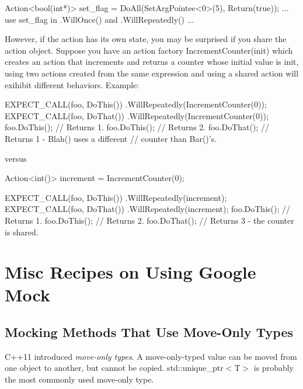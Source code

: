 \begin{DoxyCode}
Action<bool(int*)> set\_flag = DoAll(SetArgPointee<0>(5),
                                    Return(\textcolor{keyword}{true}));
... use set\_flag in .WillOnce() and .WillRepeatedly() ...
\end{DoxyCode}


However, if the action has its own state, you may be surprised if you share the action object. Suppose you have an action factory {\ttfamily Increment\+Counter(init)} which creates an action that increments and returns a counter whose initial value is {\ttfamily init}, using two actions created from the same expression and using a shared action will exihibit different behaviors. Example\+:


\begin{DoxyCode}
EXPECT\_CALL(foo, DoThis())
    .WillRepeatedly(IncrementCounter(0));
EXPECT\_CALL(foo, DoThat())
    .WillRepeatedly(IncrementCounter(0));
foo.DoThis();  \textcolor{comment}{// Returns 1.}
foo.DoThis();  \textcolor{comment}{// Returns 2.}
foo.DoThat();  \textcolor{comment}{// Returns 1 - Blah() uses a different}
               \textcolor{comment}{// counter than Bar()'s.}
\end{DoxyCode}


versus


\begin{DoxyCode}
Action<int()> increment = IncrementCounter(0);

EXPECT\_CALL(foo, DoThis())
    .WillRepeatedly(increment);
EXPECT\_CALL(foo, DoThat())
    .WillRepeatedly(increment);
foo.DoThis();  \textcolor{comment}{// Returns 1.}
foo.DoThis();  \textcolor{comment}{// Returns 2.}
foo.DoThat();  \textcolor{comment}{// Returns 3 - the counter is shared.}
\end{DoxyCode}


\section*{Misc Recipes on Using Google Mock}

\subsection*{Mocking Methods That Use Move-\/\+Only Types}

C++11 introduced {\itshape move-\/only types}. A move-\/only-\/typed value can be moved from one object to another, but cannot be copied. {\ttfamily std\+::unique\+\_\+ptr$<$T$>$} is probably the most commonly used move-\/only type.

